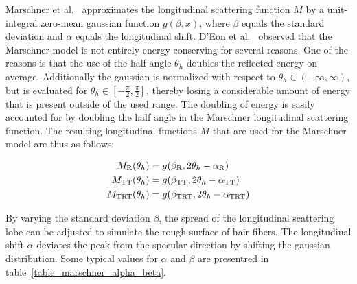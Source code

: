 \documentclass[11pt,a4paper]{report}
\begin{document}
Marschner et al.~\cite{marschner} approximates the longitudinal scattering function $M$ by a unit-integral zero-mean gaussian function $g(\beta, x)$, where $\beta$ equals the standard deviation and $\alpha$ equals the longitudinal shift. D'Eon et al.~\cite{eon2011} observed that the Marschner model is not entirely energy conserving for several reasons. One of the reasons is that the use of the half angle $\theta_h$ doubles the reflected energy on average. Additionally the gaussian is normalized with respect to $\theta_h \in (-\infty, \infty)$, but is evaluated for $\theta_h \in [-\frac{\pi}{2}, \frac{\pi}{2}]$, thereby losing a considerable amount of energy that is present outside of the used range. The doubling of energy is easily accounted for by doubling the half angle in the Marschner longitudinal scattering function. The resulting longitudinal functions $M$ that are used for the Marschner model are thus as follows:

\begin{align}
M_{\textnormal{R}}(\theta_h) &= g(\beta_{\textnormal{R}}, 2\theta_h - \alpha_{\textnormal{R}}) \\
M_{\textnormal{TT}}(\theta_h) &= g(\beta_{\textnormal{TT}}, 2\theta_h - \alpha_{\textnormal{TT}}) \\
M_{\textnormal{TRT}}(\theta_h) &= g(\beta_{\textnormal{TRT}}, 2\theta_h - \alpha_{\textnormal{TRT}})
\end{align}

By varying the standard deviation $\beta$, the spread of the longitudinal scattering lobe can be adjusted to simulate the rough surface of hair fibers. The longitudinal shift $\alpha$ deviates the peak from the specular direction by shifting the gaussian distribution. Some typical values for $\alpha$ and $\beta$ are presentred in table~\ref{table_marschner_alpha_beta}.
\end{document}
